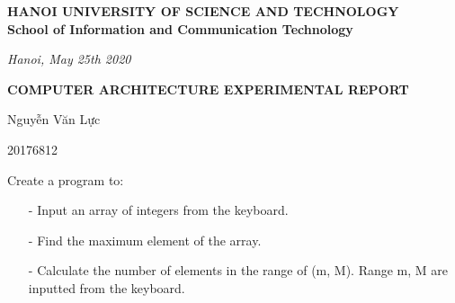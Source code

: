 \documentclass[12pt]{article}
\begin{document}
        \centering 
        \textbf{HANOI UNIVERSITY OF SCIENCE AND TECHNOLOGY}\\
        \textbf{School of Information and Communication Technology} \\
    \begin{flushright}
        \textit{Hanoi, May 25th 2020}
    \end{flushright}
    {\center \textbf{COMPUTER ARCHITECTURE EXPERIMENTAL REPORT} \vspace{15pt} \\
    }
    \begin{description}%
        \setlength\itemsep{0pt}
        \item[Full name:] Nguyễn Văn Lực
		\item[Student ID:] 20176812
		\item[Topic:] Create a program to:
		\begin{itemize}
		\item[-] Input an array of integers from the keyboard.
		\item[-] Find the maximum element of the array.
		\item[-] Calculate the number of elements in the range of (m, M). Range m, M are inputted from the keyboard.
		\end{itemize}
    \end{description}
\end{document}
